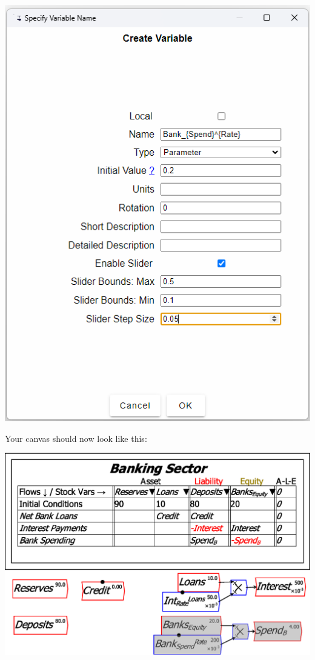 \includegraphics{images/MonetaryModel01GodleyTable05DefineFlows04}

Your canvas should now look like this:

\noindent\includegraphics[width=\textwidth]{images/MonetaryModel01GodleyTable05DefineFlows05}

